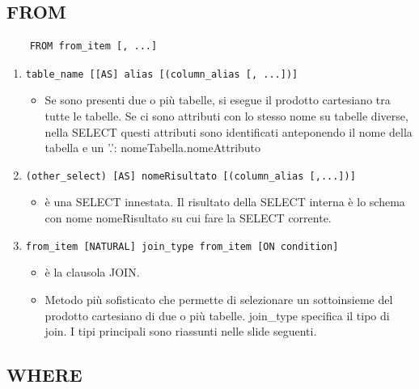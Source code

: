 \documentclass[a4paper]{article}
\begin{document}
\subsection{FROM}

\begin{verbatim}
    FROM from_item [, ...]
\end{verbatim}
\noindent

\begin{enumerate}
    \item \texttt{table\_name [[AS] alias [(column\_alias [, ...])]}
    \begin{itemize}
        \item Se sono presenti due o più tabelle, si esegue il prodotto cartesiano tra
         tutte le tabelle. Se ci sono attributi con lo stesso nome su tabelle
        diverse, nella SELECT questi attributi sono identificati anteponendo il nome
        della tabella e un ’.’: nomeTabella.nomeAttributo
    \end{itemize}
    \item \texttt{(other\_select) [AS] nomeRisultato [(column\_alias [,...])]}
    \begin{itemize}
        \item è una SELECT innestata. Il risultato della SELECT interna è lo schema con nome nomeRisultato su cui fare la SELECT corrente.
    \end{itemize}
    \item \texttt{from\_item [NATURAL] join\_type from\_item [ON condition]}
    \begin{itemize}
        \item è la clausola JOIN.
        \item Metodo più sofisticato che permette di selezionare
        un sottoinsieme del prodotto cartesiano di due o più tabelle. join\_type specifica
        il tipo di join. I tipi principali sono riassunti nelle slide seguenti.
    \end{itemize}
\end{enumerate}

\subsection{WHERE}
\end{document}
